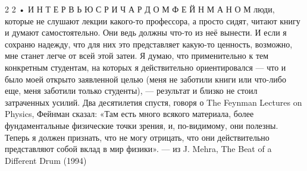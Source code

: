 \documentclass[10pt,oneside]{article}
\begin{document}
2 2 • И Н Т Е Р В Ь Ю  С  Р И Ч А Р Д О М  Ф Е Й Н М А Н О М люди, которые не слушают лекции какого-то профессора, а просто сидят, читают книгу и думают самостоятельно. Они ведь должны что-то из неё вынести. И если я сохраню надежду, что для них это представляет какую-то ценность, возможно, мне станет легче от всей этой затеи. Я думаю, что применительно к тем конкретным студентам, на которых я действительно ориентировался --- что и было моей открыто заявленной целью (меня не заботили книги или что-либо еще, меня заботили только студенты), --- результат и близко не стоил затраченных усилий.\emph{ } Два десятилетия спустя, говоря о The Feynman Lectures on Physics, Фейнман сказал: «Там есть много всякого материала, более фундаментальные физические точки зрения, и, по-видимому, они полезны. Теперь я должен признать, что не могу отрицать, что они действительно представляют собой вклад в мир физики». --- из J. Mehra, The Beat of a Different Drum (1994)\par

\clearpage
{}
\end{document}
